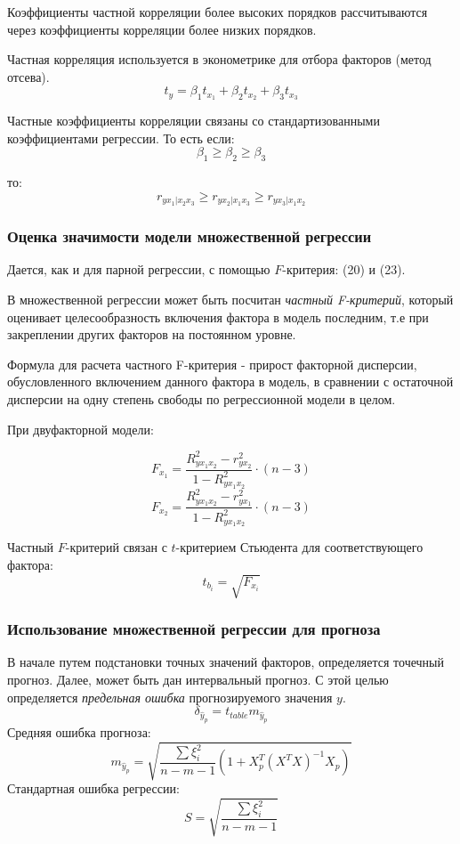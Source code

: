 \documentclass[aps,%
12pt,%
final,%
oneside,
onecolumn,%
musixtex, %
superscriptaddress,%
centertags]{article} %
\begin{document}
Коэффициенты частной корреляции более высоких порядков рассчитываются через коэффициенты корреляции более низких порядков.

Частная корреляция используется в эконометрике для отбора факторов (метод отсева).
$$ t_y = \beta_1 t_{x_1} + \beta_2 t_{x_2} + \beta_3 t_{x_3}$$


Частные коэффициенты корреляции связаны со стандартизованными коэффициентами регрессии. То есть если:
$$ \beta_1 \geq \beta_2 \geq \beta_3 $$

то:
$$
r_{yx_1|x_2x_3} \geq r_{yx_2|x_1x_3} \geq  r_{yx_3|x_1x_2} 
$$

\subsubsection{Оценка значимости модели множественной регрессии}
Дается, как и для парной регрессии, с помощью $F$-критерия: (20) и (23).

В множественной регрессии может быть посчитан \textit{частный F-критерий}, который оценивает целесообразность включения фактора в модель последним, т.е при закреплении других факторов на постоянном уровне.

Формула для расчета частного F-критерия - прирост факторной дисперсии, обусловленного включением данного фактора в модель, в сравнении с остаточной дисперсии на одну степень свободы по регрессионной модели в целом.

При двуфакторной модели:

$$F_{x_1} = \frac{R_{yx_1x_2}^2 - r_{yx_2}^2}{1-R_{yx_1x_2}^2} \cdot (n-3)$$
$$F_{x_2} = \frac{R_{yx_1x_2}^2 - r_{yx_1}^2}{1-R_{yx_1x_2}^2} \cdot (n-3)$$

Частный $F$-критерий связан с $t$-критерием Стьюдента для соответствующего фактора:
$$ t_{b_i} = \sqrt{F_{x_i}}$$

\subsubsection{Использование множественной регрессии для прогноза}

В начале путем подстановки точных значений факторов, определяется точечный прогноз. Далее, может быть дан интервальный прогноз. С этой целью определяется \textit{предельная ошибка} прогнозируемого значения $y$.
$$ \delta_{\hat{y}_p} = t_{table} m_{\hat{y}_p}$$
Средняя ошибка прогноза:
$$m_{\hat{y}_p}  = \sqrt{\frac{\sum \xi_i^2}{n-m-1} (1+X_p^T(X^T X)^{-1}X_p)}$$
Стандартная ошибка регрессии:
$$S =\sqrt{\frac{\sum \xi_i^2}{n-m-1}}$$
\end{document}
